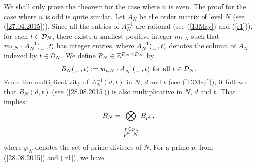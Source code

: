 \documentclass[a4paper,11pt]{amsart}
\begin{document}
We shall only prove the theorem for the case where $n$ is even. 
The proof for the case where $n$ is odd is quite similar. 
Let $A_N$ be the order matrix of level $N$ (see (\ref{27.04.2015})).
Since all the entries of $A_N^{-1}$
are rational (see (\ref{13May}) and (\ref{r1})), for each $t\in\mathcal{D}_N$, there exists a smallest positive integer $m_{{t,N}}$ such that %
$m_{{t,N}}\cdot A_N^{-1}(\un\hs,t)$
has integer entries, where $A_N^{-1}(\un\hs,t)$ denotes the 
column of $A_N$ indexed by $t\in\mathcal{D}_N$.
We define $B_N\in\mathbb{Z}^{\mathcal{D}_N\times\mathcal{D}_N}$ by
\begin{equation}
B_N(\un\hs,t):=m_{{t,N}}\cdot A_N^{-1}(\un\hs,t)\hspace{4pt}\text{for all $t\in\D$.}
\label{28.08.2015}\end{equation}
From the multiplicativity of $A_N^{-1}(d,t)$ in $N$, $d$ and $t$  (see (\ref{13May})),
it follows that $B_N(d,t)$ (see (\ref{28.08.2015})) is also multiplicative in $N$, $d$ and $t$. 
That implies:
\begin{equation}
 B_N=\bigotimes_{\substack{\ \\\ \\ \hspace*{3pt}p\in{{\wp}}_{{N}}\\p^n\|N
 }}
 B_{p^n},
\label{28.08.2015.1}\end{equation}
where ${{{\wp}}_{{N}}}$ denotes the set of prime divisors of $N$.
For a prime $p$, %
from (\ref{28.08.2015}) and %
(\ref{r1}), we have %
\end{document}
